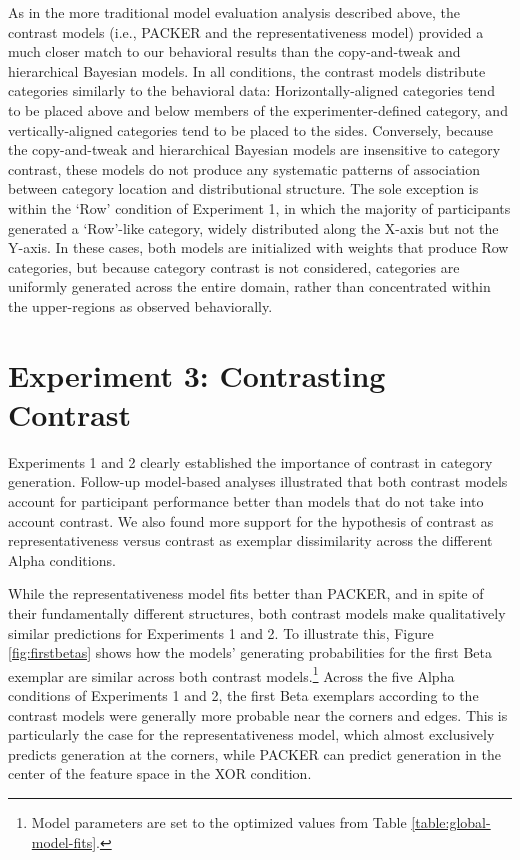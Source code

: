 \documentclass[pdflatex,sn-apa]{sn-jnl}%
\theoremstyle{thmstyleone}%
\theoremstyle{thmstyletwo}%
\theoremstyle{thmstylethree}%
\begin{document}
As in the more traditional model evaluation analysis described above, the
contrast models (i.e., PACKER and the representativeness model) provided a much
closer match to our behavioral results than the copy-and-tweak and hierarchical
Bayesian models. In all conditions, the contrast models distribute categories
similarly to the behavioral data: Horizontally-aligned categories tend to be
placed above and below members of the experimenter-defined category, and
vertically-aligned categories tend to be placed to the sides. Conversely,
because the copy-and-tweak and hierarchical Bayesian models are insensitive to
category contrast, these models do not produce any systematic patterns of
association between category location and distributional structure. The sole
exception is within the `Row' condition of Experiment 1, in which the majority
of participants generated a `Row'-like category, widely distributed along the
X-axis but not the Y-axis. In these cases, both models are initialized with
weights that produce Row categories, but because category contrast is not
considered, categories are uniformly generated across the entire domain, rather
than concentrated within the upper-regions as observed behaviorally.

\section{Experiment 3: Contrasting Contrast}
\label{section:diffcon}
Experiments 1 and 2 clearly established the importance of contrast in category
generation. Follow-up model-based analyses illustrated that both contrast models account for participant performance better than models that do not take into
account contrast. We also found more support for the hypothesis of contrast as
representativeness versus contrast as exemplar dissimilarity across the
different Alpha conditions.

While the representativeness model fits better than PACKER, and in spite of their fundamentally different structures,
both contrast models make qualitatively similar predictions for Experiments 1 and 2. To illustrate this, Figure
\ref{fig:firstbetas} shows how the models' generating probabilities for the first Beta exemplar are similar across both
contrast models.\footnote{Model parameters are set to the optimized values from Table \ref{table:global-model-fits}.}
Across the five Alpha conditions of Experiments 1 and 2, the first Beta exemplars according to the contrast models were
generally more probable near the corners and edges. This is particularly the case for the representativeness model,
which almost exclusively predicts generation at the corners, while PACKER can predict generation in the center of the
feature space in the XOR condition.
\end{document}

